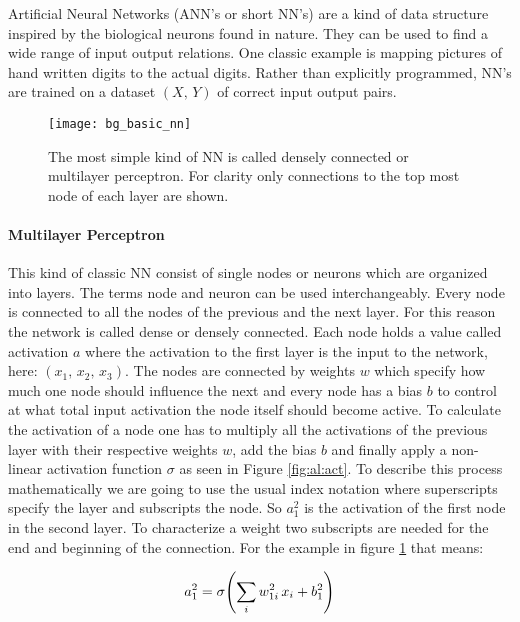 Artificial Neural Networks (ANN's or short NN's) are a kind of data structure inspired by the biological neurons found in nature. They can be used to find a wide range of input output relations. One classic example is mapping pictures of hand written digits to the actual digits. Rather than explicitly programmed, NN's are trained on a dataset $(X, \, Y)$ of correct input output pairs.
\\


\begin{figure}[H]
    \centering
    \texttt{[image: bg\_basic\_nn]}
    \caption{The most simple kind of NN is called densely connected or multilayer perceptron. For clarity only connections to the top most node of each layer are shown.}
    \label{fig:bg:basic_nn}
\end{figure}

\paragraph{Multilayer Perceptron}
This kind of classic NN consist of single nodes or neurons which are organized into layers. The terms node and neuron can be used interchangeably. Every node is connected to all the nodes of the previous and the next layer. For this reason the network is called dense or densely connected. Each node holds a value called activation $a$ where the activation to the first layer is the input to the network, here:
$(x_1, \, x_2, \, x_3)$.
The nodes are connected by weights $w$ which specify how much one node should influence the next and every node has a bias $b$ to control at what total input activation the node itself should become active.
To calculate the activation of a node one has to multiply all the activations of the previous layer with their respective weights $w$, add the bias $b$ and finally apply a non-linear activation function $\sigma$ as seen in Figure \ref{fig:al:act}. To describe this process mathematically we are going to use the usual index notation where superscripts specify the layer and subscripts the node. So $a^2_1$ is the activation of the first node in the second layer. To characterize a weight two subscripts are needed for the end and beginning of the connection. For the example in figure \ref{fig:bg:basic_nn} that means:

\begin{equation} \label{eq:bg:activation_example}
    a^2_1 = \sigma \qty(\sum_i w^2_{1i} \, x_i + b^2_1)
\end{equation}

